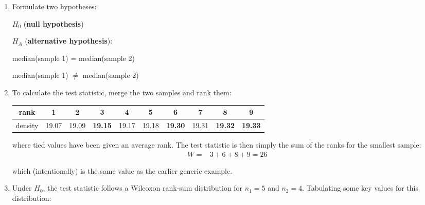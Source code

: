 \begin{enumerate}
\item  Formulate two hypotheses:

  \noindent\begin{minipage}{.4\textwidth}
    $H_0$ (\textbf{null hypothesis})
    
    \vspace{1em}
    
    $H_{\!A}$ (\textbf{alternative hypothesis}):
  \end{minipage}
  \begin{minipage}{.2\textwidth}
  \end{minipage}
  \begin{minipage}{.4\textwidth}
    median(sample 1) = median(sample 2)
    
    \vspace{1em}
    
    median(sample 1) $\neq$ median(sample 2)
  \end{minipage}
  
\item To calculate the test statistic, merge the two samples and rank
  them:

  \begin{center}
    \begin{tabular}{c|ccccccccc}
      rank & 1 & 2 & \textbf{3} & 4 & 5 & \textbf{6} & 7 &
      \textbf{8} & \textbf{9} \\ \hline
      density & 19.07 & 19.09 & \textbf{19.15} & 19.17 & 19.18 &
      \textbf{19.30} & 19.31 & \textbf{19.32} & \textbf{19.33}
    \end{tabular}
  \end{center}

  \noindent where tied values have been given an average rank. The
  test statistic is then simply the sum of the ranks for the smallest
  sample:
  \begin{equation*}
    \begin{split}
      W = & 3 + 6 + 8 + 9 = 26
    \end{split}
  \end{equation*}

  \noindent which (intentionally) is the same value as the earlier
  generic example.

\item Under $H_0$, the test statistic follows a Wilcoxon rank-sum
  distribution for $n_1=5$ and $n_2=4$. Tabulating some key values for
  this distribution:


\end{enumerate}
